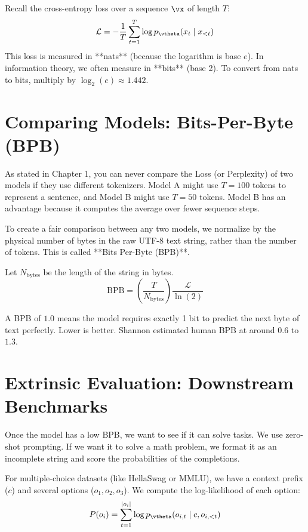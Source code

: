 Recall the cross-entropy loss over a sequence $\vx$ of length $T$:
\begin{equation}
\mathcal{L} = -\frac{1}{T}\sum_{t=1}^T \log p_{\vtheta}(x_t \mid x_{<t})
\end{equation}
This loss is measured in **nats** (because the logarithm is base $e$).
In information theory, we often measure in **bits** (base 2). To convert from nats to bits, multiply by $\log_2(e) \approx 1.442$.

\section{Comparing Models: Bits-Per-Byte (BPB)}
\label{ch:13:sec:main}

As stated in Chapter 1, you can never compare the Loss (or Perplexity) of two models if they use different tokenizers. Model A might use $T=100$ tokens to represent a sentence, and Model B might use $T=50$ tokens. Model B has an advantage because it computes the average over fewer sequence steps.

To create a fair comparison between any two models, we normalize by the physical number of bytes in the raw UTF-8 text string, rather than the number of tokens. This is called **Bits Per-Byte (BPB)**.

Let $N_{\text{bytes}}$ be the length of the string in bytes. 
\begin{equation}
\label{eq:13:bpb}
\text{BPB} = \left(\frac{T}{N_{\text{bytes}}}\right) \frac{\mathcal{L}}{\ln(2)}
\end{equation}

A BPB of $1.0$ means the model requires exactly 1 bit to predict the next byte of text perfectly. Lower is better. Shannon estimated human BPB at around $0.6$ to $1.3$.

\section{Extrinsic Evaluation: Downstream Benchmarks}

Once the model has a low BPB, we want to see if it can solve tasks. We use zero-shot prompting. If we want it to solve a math problem, we format it as an incomplete string and score the probabilities of the completions.

For multiple-choice datasets (like HellaSwag or MMLU), we have a context prefix ($c$) and several options ($o_1, o_2, o_3$).
We compute the log-likelihood of each option:
\begin{equation}
P(o_i) = \sum_{t=1}^{|o_i|} \log p_{\vtheta}(o_{i,t} \mid c, o_{i, <t})
\end{equation}

